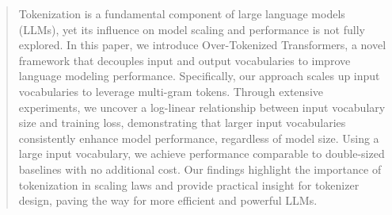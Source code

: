 \documentclass{article}
\theoremstyle{plain}
\theoremstyle{definition}
\theoremstyle{remark}
\begin{document}
\begin{abstract}
Tokenization is a fundamental component of large language models (LLMs), yet its influence on model scaling and performance is not fully explored. In this paper, we introduce Over-Tokenized Transformers, a novel framework that decouples input and output vocabularies to improve language modeling performance. Specifically, our approach scales up input vocabularies to leverage multi-gram tokens. Through extensive experiments, we uncover a log-linear relationship between input vocabulary size and training loss, demonstrating that larger input vocabularies consistently enhance model performance, regardless of model size. Using a large input vocabulary, we achieve performance comparable to double-sized baselines with no additional cost. Our findings highlight the importance of tokenization in scaling laws and provide practical insight for tokenizer design, paving the way for more efficient and powerful LLMs.
\end{abstract}












\newpage
\appendix
\onecolumn





\end{document}
